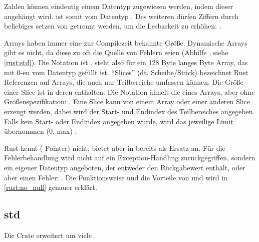 Zahlen können eindeutig einem Datentyp zugewiesen werden, indem dieser angehängt wird.
 ist somit vom Datentyp .
Des weiteren dürfen Ziffern durch beliebiges setzen von \rustcinline{_} getrennt werden, um die Lesbarkeit zu erhöhen: .

Arrays haben immer eine zur Compilezeit bekannte Größe. Dynamische Arrays gibt es nicht, da diese zu oft die Quelle von Fehlern seien  (Abhilfe , siehe \autoref{rust:std}).
Die Notation ist .
\rustcinline{[0_u8; 128]} steht also für ein 128 Byte langes Byte Array, das mit 0-en vom Datentyp  gefüllt ist.
\enquote{Slices} (dt. Scheibe/Stück) bezeichnet Rust Referenzen auf Arrays, die auch nur Teilbereiche umfassen können.
Die Größe einer Slice ist in deren   enthalten.
Die Notation ähnelt die eines Arrays, aber ohne Größenspezifikation: \rustcinline{[<Datentyp>]}.
Eine Slice kann von einem Array oder einer anderen Slice erzeugt werden, dabei wird der Start- und Endindex des Teilbereiches angegeben.
Falls kein Start- oder Endindex angegeben wurde, wird das jeweilige Limit übernommen (0, max) : 

Rust kennt (-Pointer) nicht, bietet aber in  bereits  als Ersatz an.
Für die Fehlerbehandlung wird nicht auf ein Exception-Handling zurückgegriffen, sondern ein eigener Datentyp angeboten, der entweder den Rückgabewert enthält, oder aber einen Fehler: .
Die Funktionsweise und die Vorteile von  und  wird in \autoref{rust:no_null} genauer erklärt.

\subsection{std}
\label{rust:std}

Die Crate  erweitert  um viele .






